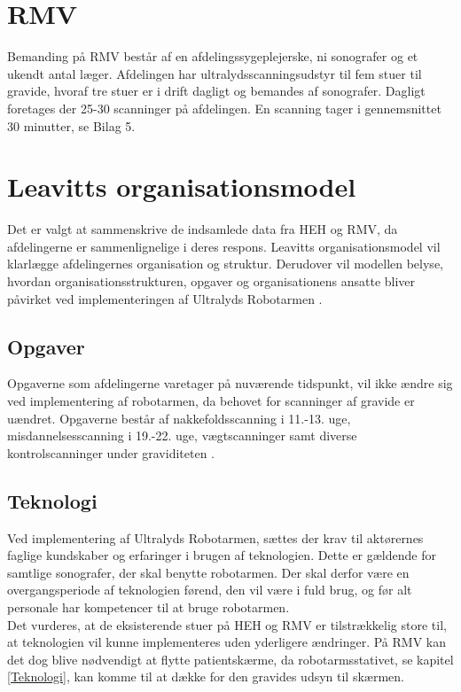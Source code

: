 \section{RMV}
Bemanding på RMV består af en afdelingssygeplejerske, ni sonografer og et ukendt antal læger. Afdelingen har ultralydsscanningsudstyr til fem stuer til gravide, hvoraf tre stuer er i drift dagligt og bemandes af sonografer. Dagligt foretages der 25-30 scanninger på afdelingen. En scanning tager i gennemsnittet 30 minutter, se Bilag 5.

\section{Leavitts organisationsmodel}
Det er valgt at sammenskrive de indsamlede data fra HEH og RMV, da afdelingerne er sammenlignelige i deres respons. Leavitts organisationsmodel vil klarlægge afdelingernes organisation og struktur. Derudover vil modellen belyse, hvordan organisationsstrukturen, opgaver og organisationens ansatte bliver påvirket ved implementeringen af Ultralyds Robotarmen \cite{Leavitt} \cite{diamantmodel}. 

\subsection{Opgaver}
Opgaverne som afdelingerne varetager på nuværende tidspunkt, vil ikke ændre sig ved implementering af robotarmen, da behovet for scanninger af gravide er uændret. Opgaverne består af nakkefoldsscanning i 11.-13. uge, misdannelsesscanning i 19.-22. uge, vægtscanninger samt diverse kontrolscanninger under graviditeten \cite{graviditet}.

\subsection{Teknologi}
Ved implementering af Ultralyds Robotarmen, sættes der krav til aktørernes faglige kundskaber og erfaringer i brugen af teknologien. Dette er gældende for samtlige sonografer, der skal benytte robotarmen. Der skal derfor være en overgangsperiode af teknologien førend, den vil være i fuld brug, og før alt personale har kompetencer til at bruge robotarmen. \\
Det vurderes, at de eksisterende stuer på HEH og RMV er tilstrækkelig store til, at teknologien vil kunne implementeres uden yderligere ændringer. På RMV kan det dog blive nødvendigt at flytte patientskærme, da robotarmsstativet, se kapitel \ref{Teknologi}, kan komme til at dække for den gravides udsyn til skærmen.  

